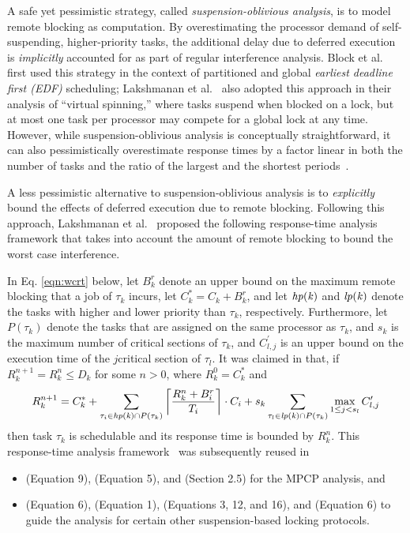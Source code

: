 A safe yet pessimistic strategy, called \emph{suspension-oblivious analysis}, is to model remote blocking as computation. By overestimating the processor demand of self-suspending, higher-priority tasks, the additional delay due to deferred execution is \emph{implicitly} accounted for as part of regular interference analysis. Block et al.~\cite{block-2007} first used this strategy in the context of partitioned and global \emph{earliest deadline first (EDF)} scheduling; Lakshmanan et al.~\cite{lakshmanan-2009} also adopted this approach in their analysis of ``virtual spinning,'' where tasks suspend when blocked on a lock, but at most one task per processor may compete for a global lock at any time. However, while suspension-oblivious analysis is conceptually straightforward, it can also pessimistically overestimate response times by a factor linear in both the number of tasks and the ratio of the largest and the shortest periods~\cite{wieder-2013}.

A less pessimistic alternative to suspension-oblivious analysis is to \emph{explicitly} bound the effects of deferred execution due to remote blocking. Following this approach, Lakshmanan et al.~\cite{lakshmanan-2009} proposed the following response-time analysis framework that takes into account the amount of remote blocking to bound the worst case interference.

In Eq. \eqref{eqn:wcrt} below, let $B_k^r$ denote an upper bound on the maximum remote blocking that a job of $\tau_k$ incurs, let $C_k^{\ast} = C_k + B_k^r$, and let $\mathit{hp(k)}$ and $\mathit{lp(k)}$ denote the tasks with higher and lower priority than $\tau_k$, respectively. Furthermore, let $P(\tau_k)$ denote the tasks that are assigned on the same processor as $\tau_k$, and $s_k$ is the maximum number of critical sections of $\tau_k$, and $C_{l,j}^{\prime}$ is an upper bound on the execution time of the $j$\xth critical section of $\tau_l$. It was claimed in \cite{lakshmanan-2009} that, if $R_k^{n+1} = R_k^n \leq D_k$ for some $n > 0$, where $R_k^0 = C_k^{\ast}$ and
\begin{equation}
\label{eqn:wcrt}
R_k^{n+1} = C_k^{\ast} + \sum_{\tau_i \in \mathit{hp(k)} \cap P(\tau_k)} \left \lceil \frac{R_k^n + B_i^r}{T_i} \right \rceil \cdot C_i + s_k \sum_{\tau_l \in \mathit{lp(k)} \cap P(\tau_k)} \max_{1 \leq j < s_l} C_{l,j}^{\prime}
\end{equation}
then task $\tau_k$ is schedulable and its response time is bounded by $R_k^n$. This  response-time analysis framework~\cite{lakshmanan-2009} was subsequently reused in
\begin{itemize}
\item \cite{zeng-2011} (Equation 9), \cite{han-2014}(Equation 5), and \cite{yang-2014} (Section 2.5) for the MPCP analysis, and
\item \cite{yang-2013} (Equation 6), \cite{bbb-2013} (Equation 1), \cite{carminati-2014} (Equations 3, 12, and 16), and \cite{kim-2014} (Equation 6) to guide the analysis for certain other suspension-based locking protocols.
\end{itemize}

